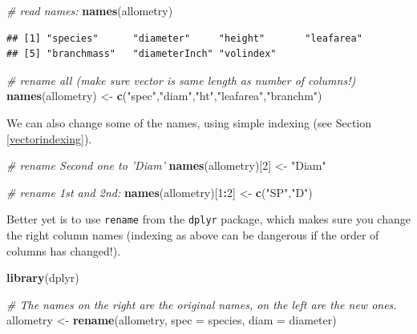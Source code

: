 \documentclass[]{book}
\newenvironment{Shaded}{\begin{snugshade}}{\end{snugshade}}
\newcommand{\CommentTok}[1]{\textcolor[rgb]{0.56,0.35,0.01}{\textit{#1}}}
\newcommand{\DataTypeTok}[1]{\textcolor[rgb]{0.13,0.29,0.53}{#1}}
\newcommand{\DecValTok}[1]{\textcolor[rgb]{0.00,0.00,0.81}{#1}}
\newcommand{\KeywordTok}[1]{\textcolor[rgb]{0.13,0.29,0.53}{\textbf{#1}}}
\newcommand{\NormalTok}[1]{#1}
\newcommand{\OperatorTok}[1]{\textcolor[rgb]{0.81,0.36,0.00}{\textbf{#1}}}
\newcommand{\StringTok}[1]{\textcolor[rgb]{0.31,0.60,0.02}{#1}}
\begin{document}
\begin{Shaded}
\begin{Highlighting}[]
\CommentTok{# read names:}
\KeywordTok{names}\NormalTok{(allometry)}
\end{Highlighting}
\end{Shaded}

\begin{verbatim}
## [1] "species"      "diameter"     "height"       "leafarea"    
## [5] "branchmass"   "diameterInch" "volindex"
\end{verbatim}

\begin{Shaded}
\begin{Highlighting}[]
\CommentTok{# rename all (make sure vector is same length as number of columns!)}
\KeywordTok{names}\NormalTok{(allometry) <-}\StringTok{ }\KeywordTok{c}\NormalTok{(}\StringTok{"spec"}\NormalTok{,}\StringTok{"diam"}\NormalTok{,}\StringTok{"ht"}\NormalTok{,}\StringTok{"leafarea"}\NormalTok{,}\StringTok{"branchm"}\NormalTok{)}
\end{Highlighting}
\end{Shaded}

We can also change some of the names, using simple indexing (see Section \ref{vectorindexing}).

\begin{Shaded}
\begin{Highlighting}[]
\CommentTok{# rename Second one to 'Diam'}
\KeywordTok{names}\NormalTok{(allometry)[}\DecValTok{2}\NormalTok{] <-}\StringTok{ "Diam"}

\CommentTok{# rename 1st and 2nd:}
\KeywordTok{names}\NormalTok{(allometry)[}\DecValTok{1}\OperatorTok{:}\DecValTok{2}\NormalTok{] <-}\StringTok{ }\KeywordTok{c}\NormalTok{(}\StringTok{"SP"}\NormalTok{,}\StringTok{"D"}\NormalTok{)}
\end{Highlighting}
\end{Shaded}

Better yet is to use \texttt{rename} from the \texttt{dplyr} package, which makes sure you change the right column names (indexing as above can be dangerous if the order of columns has changed!).

\begin{Shaded}
\begin{Highlighting}[]
\KeywordTok{library}\NormalTok{(dplyr)}

\CommentTok{# The names on the right are the original names, on the left are the new ones.}
\NormalTok{allometry <-}\StringTok{ }\KeywordTok{rename}\NormalTok{(allometry, }
                       \DataTypeTok{spec =}\NormalTok{ species,}
                       \DataTypeTok{diam =}\NormalTok{ diameter)}
\end{Highlighting}
\end{Shaded}
\end{document}
